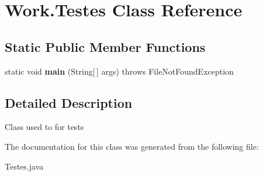 \hypertarget{classWork_1_1Testes}{}\section{Work.\+Testes Class Reference}
\label{classWork_1_1Testes}
\subsection*{Static Public Member Functions}
\begin{DoxyCompactItemize}
\item 
\mbox{\label{classWork_1_1Testes_a15006d6c0c1d3f615a147959fd7f817b}} 
static void {\bfseries main} (String\mbox{[}$\,$\mbox{]} args)  throws File\+Not\+Found\+Exception 
\end{DoxyCompactItemize}


\subsection{Detailed Description}
Class used to for tests 

The documentation for this class was generated from the following file\+:\begin{DoxyCompactItemize}
\item 
Testes.\+java\end{DoxyCompactItemize}
